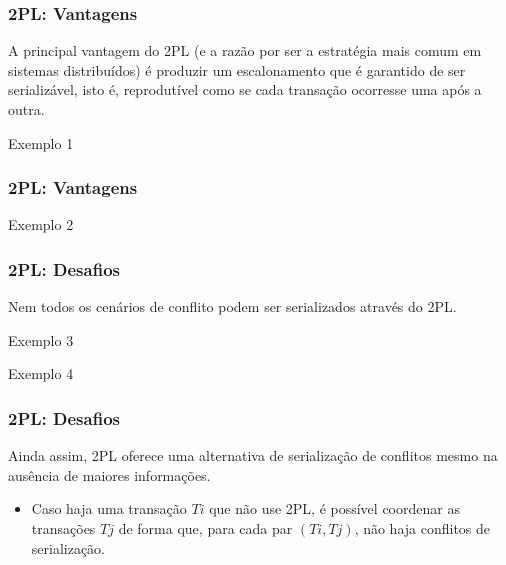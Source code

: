 \documentclass{beamer}
\begin{document}

\begin{frame}
    \frametitle{2PL: Vantagens}

    A principal vantagem do 2PL (e a razão por ser a estratégia mais comum em sistemas distribuídos) é produzir um escalonamento que é garantido de ser serializável, isto é, reprodutível como se cada transação ocorresse uma após a outra.
    
    \medskip
    \begin{example}{Exemplo 1}
    \end{example}
\end{frame}


\begin{frame}
    \frametitle{2PL: Vantagens}

    \begin{example}{Exemplo 2}
    \end{example}

\end{frame}


\begin{frame}
\frametitle{2PL: Desafios}
    Nem todos os cenários de conflito podem ser serializados através do 2PL. 

    \begin{example}{Exemplo 3}
    \end{example}

    \medskip
    \begin{example}{Exemplo 4}
    \end{example}

\end{frame}


\begin{frame}
    \frametitle{2PL: Desafios}

    Ainda assim, 2PL oferece uma alternativa de serialização de conflitos mesmo na ausência de maiores informações. 

    \medskip
    \begin{itemize}
        \item Caso haja uma transação $Ti$ que não use 2PL, é possível coordenar as transações $Tj$ de forma que, para cada par $(Ti, Tj)$, não haja conflitos de serialização.
    \end{itemize}

    \medskip
\end{frame}
\end{document}

